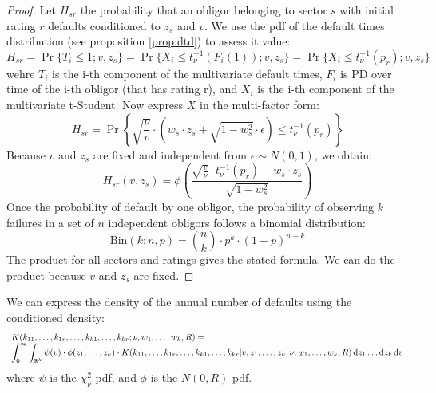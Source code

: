 \documentclass[11pt,fleqn]{book} %
\begin{document}
\begin{proof}
Let $H_{sr}$ the probability that an obligor belonging to sector $s$
with initial rating $r$ defaults conditioned to $z_s$ and $v$.
We use the pdf of the default times distribution (see proposition \ref{prop:dtd})
to assess it value:
\begin{displaymath}
H_{sr} = 
\Pr\{T_i \le 1; v, z_s\} = 
\Pr\{ X_i \le t_{\nu}^{-1}(F_i(1)); v, z_s\} = 
\Pr\{ X_i \le t_{\nu}^{-1}(p_r); v, z_s\}
\end{displaymath}
wehre $T_i$ is the i-th component of the multivariate default times,
$F_i$ is PD over time of the i-th obligor (that has rating r),
and $X_i$ is the i-th component of the multivariate t-Student.
Now express $X$ in the multi-factor form:
\begin{displaymath}
H_{sr} = \Pr \left\{ 
\sqrt{\frac{\nu}{v}} \cdot \left( w_s \cdot z_s + \sqrt{1-w_s^2} \cdot \epsilon\right)
\le t_{\nu}^{-1}(p_r)
\right\}
\end{displaymath}
Because $v$ and $z_s$ are fixed and independent from $\epsilon \sim N(0,1)$, we obtain:
\begin{displaymath}
H_{sr}(v,z_s) = \phi\left(  
\frac{\sqrt{\frac{v}{\nu}} \cdot t_{\nu}^{-1}(p_r) - w_s\cdot z_s}{\sqrt{1-w_s^2}}
\right)
\end{displaymath}
Once the probability of default by one obligor, the probability of observing 
$k$ failures in a set of $n$ independent obligors follows a binomial distribution:
\begin{displaymath}
\text{Bin}(k;n,p) = \binom{n}{k} \cdot p^k \cdot (1-p)^{n-k}
\end{displaymath}
The product for all sectors and ratings gives the stated formula. We can do the product
because $v$ and $z_s$ are fixed.
\end{proof}

\begin{corollary}
We can express the density of the annual number of defaults using the
conditioned density:
\begin{displaymath}
\begin{array}{l}
K(k_{11},\dots,k_{1r},\dots,k_{k1},\dots,k_{kr} ; \nu, w_1,\dots,w_k, R) = \\
\displaystyle \int_0^{\infty} \int_{\mathbb{R}^k}
\psi(v) \cdot \phi(z_1,\dots,z_k) \cdot
K(k_{11},\dots,k_{1r},\dots,k_{k1},\dots,k_{kr} | v,z_1,\dots,z_k; \nu, w_1,\dots,w_k, R)
\mathop{\mathrm{{}d}}\mathopen{} z_1 \dots \mathop{\mathrm{{}d}}\mathopen{} z_k \mathop{\mathrm{{}d}}\mathopen{} v
\end{array}
\end{displaymath}
where $\psi$ is the $\chi_{\nu}^2$ pdf, and $\phi$ is the $N(0,R)$ pdf.
\end{corollary}
\end{document}
